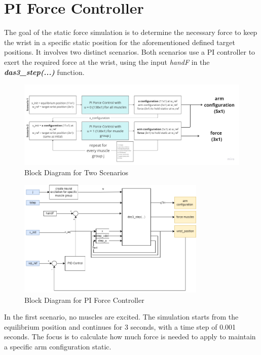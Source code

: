 \newpage
\section{PI Force Controller}\label{sec:PI}

 The goal of the static force simulation is to determine the necessary force to keep the wrist in a specific static position for the aforementioned defined target positions. It involves two distinct scenarios. Both scenarios use a PI controller to exert the required force at the wrist, using the input \textit{handF} in the \textbf{\textit{das3\_step(...)}} function.
 
\begin{figure}[h!]
    \centering
    \includegraphics[width=\textwidth]{Pictures/Model/PIForces Scenarios.png}
    \caption{Block Diagram for Two Scenarios}
    \label{fig:PITSlockDiagram}
\end{figure}

\begin{figure}[h!]
    \centering
    \includegraphics[width=0.8\textwidth]{Pictures/Model/PIController.png}
    \caption{Block Diagram for PI Force Controller}
    \label{fig:PIBlockDiagram}
\end{figure}



In the first scenario, no muscles are excited. The simulation starts from the equilibrium position and continues for 3 seconds, with a time step of 0.001 seconds. The focus is to calculate how much force is needed to apply to maintain a specific arm configuration static.

